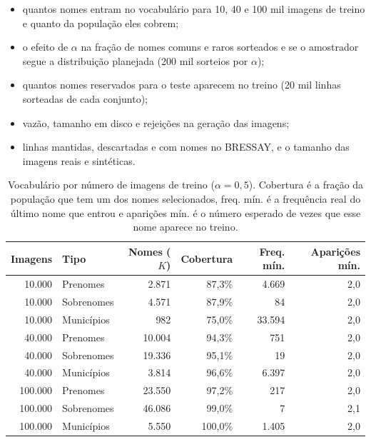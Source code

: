 \documentclass[12pt,a4paper]{article}
\begin{document}
\begin{itemize}
    \item quantos nomes entram no vocabulário para 10, 40 e 100 mil imagens de treino e quanto da população eles cobrem;
    \item o efeito de $\alpha$ na fração de nomes comuns e raros sorteados e se o amostrador segue a distribuição planejada (200 mil sorteios por $\alpha$);
    \item quantos nomes reservados para o teste aparecem no treino (20 mil linhas sorteadas de cada conjunto);
    \item vazão, tamanho em disco e rejeições na geração das imagens;
    \item linhas mantidas, descartadas e com nomes no BRESSAY, e o tamanho das imagens reais e sintéticas.
\end{itemize}

\begin{table}[H]
\centering
\small
\begin{tabular}{@{}rlrrrr@{}}
\toprule
Imagens & Tipo & Nomes ($K$) & Cobertura & Freq. mín. & Aparições mín. \\
\midrule
10.000 & Prenomes & 2.871 & 87,3\% & 4.669 & 2,0 \\
10.000 & Sobrenomes & 4.571 & 87,9\% & 84 & 2,0 \\
10.000 & Municípios & 982 & 75,0\% & 33.594 & 2,0 \\
\midrule
40.000 & Prenomes & 10.004 & 94,3\% & 751 & 2,0 \\
40.000 & Sobrenomes & 19.336 & 95,1\% & 19 & 2,0 \\
40.000 & Municípios & 3.814 & 96,6\% & 6.397 & 2,0 \\
\midrule
100.000 & Prenomes & 23.550 & 97,2\% & 217 & 2,0 \\
100.000 & Sobrenomes & 46.086 & 99,0\% & 7 & 2,1 \\
100.000 & Municípios & 5.550 & 100,0\% & 1.405 & 2,0 \\
\bottomrule
\end{tabular}
\caption{Vocabulário por número de imagens de treino ($\alpha = 0{,}5$). Cobertura é a fração da população que tem um dos nomes selecionados, freq. mín. é a frequência real do último nome que entrou e aparições mín. é o número esperado de vezes que esse nome aparece no treino.}
\label{tab:vocab}
\end{table}
\end{document}
